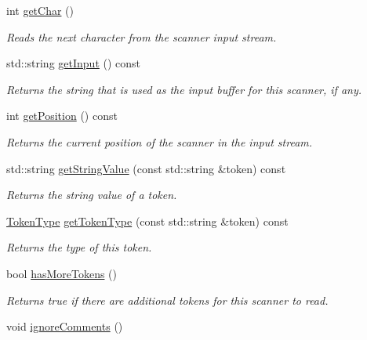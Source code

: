 \begin{DoxyCompactItemize}
int \mbox{\hyperlink{classTokenScanner_aa1ac28f13062f093eb32a49dce4c63f8}{get\+Char}} ()
\begin{DoxyCompactList}\small\item\em Reads the next character from the scanner input stream. \end{DoxyCompactList}\item 
std\+::string \mbox{\hyperlink{classTokenScanner_ae2c34694d98dc66a7493339061a4358e}{get\+Input}} () const
\begin{DoxyCompactList}\small\item\em Returns the string that is used as the input buffer for this scanner, if any. \end{DoxyCompactList}\item 
int \mbox{\hyperlink{classTokenScanner_a6c9c9aa34f1ae28cd7a4f150e2df8201}{get\+Position}} () const
\begin{DoxyCompactList}\small\item\em Returns the current position of the scanner in the input stream. \end{DoxyCompactList}\item 
std\+::string \mbox{\hyperlink{classTokenScanner_ac9f2b60ecc3007903307c3cb49fd5df1}{get\+String\+Value}} (const std\+::string \&token) const
\begin{DoxyCompactList}\small\item\em Returns the string value of a token. \end{DoxyCompactList}\item 
\mbox{\hyperlink{classTokenScanner_aa520fbf142ba1e7e659590c07da31921}{Token\+Type}} \mbox{\hyperlink{classTokenScanner_a8f4bb404c615ef48e20db70c1870048e}{get\+Token\+Type}} (const std\+::string \&token) const
\begin{DoxyCompactList}\small\item\em Returns the type of this token. \end{DoxyCompactList}\item 
bool \mbox{\hyperlink{classTokenScanner_af690597352ca6f48a9f86b527cd754da}{has\+More\+Tokens}} ()
\begin{DoxyCompactList}\small\item\em Returns {\ttfamily true} if there are additional tokens for this scanner to read. \end{DoxyCompactList}\item 
void \mbox{\hyperlink{classTokenScanner_a2948758a40dec8f13f9de47352afcc9f}{ignore\+Comments}} ()
\begin{DoxyCompactList}\small\item\em ~\newline

\end{DoxyCompactList}
\end{DoxyCompactItemize}
